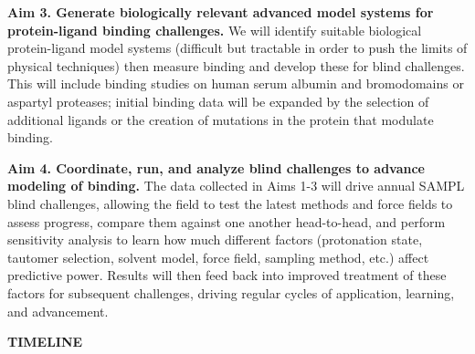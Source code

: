 \documentclass[11pt]{article}
\begin{document}
{\bf Aim 3. Generate biologically relevant advanced model systems for protein-ligand binding challenges.}
We will identify suitable biological protein-ligand model systems (difficult but tractable in order to push the limits of physical techniques) then measure binding and develop these for blind challenges. This will include binding studies on human serum albumin and bromodomains or aspartyl proteases; initial binding data will be expanded by the selection of additional ligands or the creation of mutations in the protein that modulate binding.


{\bf Aim 4. Coordinate, run, and analyze blind challenges to advance modeling of binding.}
The data collected in Aims 1-3 will drive annual SAMPL blind challenges, allowing the field to test the latest methods and force fields to assess progress, compare them against one another head-to-head, and perform sensitivity analysis to learn how much different factors (protonation state, tautomer selection, solvent model, force field, sampling method, etc.) affect predictive power. Results will then feed back into improved treatment of these factors for subsequent challenges, driving regular cycles of application, learning, and advancement.




{\bf \large TIMELINE} %
\end{document}
